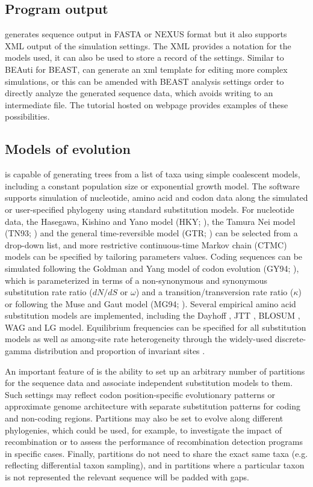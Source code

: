 \subsection{Program output} 

{\bussname} generates sequence output in FASTA or NEXUS format but it also supports XML output of the simulation settings. 
The XML provides a notation for the models used, it can also be used to store a record of the settings.
Similar to BEAuti for BEAST, {\bussname} can generate an xml template for editing more complex simulations, or this can be amended with BEAST analysis settings order to directly analyze the generated sequence data, which avoids writing to an intermediate file.
The tutorial hosted on {\bussname} webpage provides examples of these possibilities.

\subsection{Models of evolution} 

{\bussname} is capable of generating trees from a list of taxa using simple coalescent models, including a constant population size or exponential growth model.
The software supports simulation of nucleotide, amino acid and codon data along the simulated or user-specified phylogeny using standard substitution models.
For nucleotide data, the Hasegawa, Kishino and Yano model (HKY; \cite{Hasegawa1985}), the Tamura Nei model (TN93; \cite{Tamura1993}) and the general time-reversible model (GTR; \cite{GTR}) can be selected from a drop-down list, and more restrictive continuous-time Markov chain (CTMC) models can be specified by tailoring parameters values.  
Coding sequences can be simulated following the Goldman and Yang model of codon evolution (GY94; \cite{Goldman1994}), which is parameterized in terms of a non-synonymous and synonymous substitution rate ratio ($dN/dS$ or $\omega$) and a transition/transversion rate ratio ($\kappa$) or following the Muse and Gaut model (MG94; \cite{Muse1994}).
Several empirical amino acid substitution models are implemented, including the Dayhoff \cite{Dayhoff1978}, JTT \cite{Jones1992}, BLOSUM \cite{Henikoff1992}, WAG \cite{WAG} and LG \cite{LG} model.
Equilibrium frequencies can be specified for all substitution models as well as among-site rate heterogeneity through the widely-used discrete-gamma distribution \cite{Yang1996} and proportion of invariant sites \cite{Gu1995}. 

An important feature of {\bussname} is the ability to set up an arbitrary number of partitions for the sequence data and associate independent substitution models to them.
Such settings may reflect codon position-specific evolutionary patterns or approximate genome architecture with separate substitution patterns for coding and non-coding regions.
Partitions may also be set to evolve along different phylogenies, which could be used, for example, to investigate the impact of recombination or to assess the performance of recombination detection programs in specific cases.
Finally, partitions do not need to share the exact same taxa (e.g. reflecting differential taxon sampling), and in partitions where a particular taxon is not represented the relevant sequence will be padded with gaps. 

